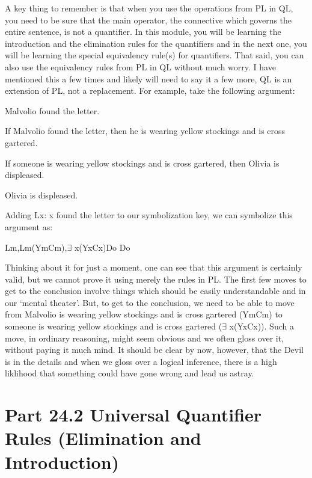 A key thing to remember is that when you use the operations from PL in QL, you need to be sure that the main operator, the connective which governs the entire sentence, is not a quantifier. In this module, you will be learning the introduction and the elimination rules for the quantifiers and in the next one, you will be learning the special equivalency rule(s) for quantifiers. That said, you can also use the equivalency rules from PL in QL without much worry. I have mentioned this a few times and likely will need to say it a few more, QL is an extension of PL, not a replacement. For example, take the following argument:
\begin{earg}
\item[]Malvolio found the letter.
\item[]If Malvolio found the letter, then he is wearing yellow stockings and is cross gartered.
\item[]If someone is wearing yellow stockings and is cross gartered, then Olivia is displeased.
\item[\therefore ] Olivia is displeased.
\end{earg}
Adding Lx: x found the letter to our symbolization key, we can symbolize this argument as:
\begin{center}
Lm,Lm\eif (Ym\eand Cm),$\exists$ x(Yx\eand Cx)\eif Do \therefore Do
\end{center}
Thinking about it for just a moment, one can see that this argument is certainly valid, but we cannot prove it using merely the rules in PL. The first few moves to get to the conclusion involve things which should be easily understandable and in our ‘mental theater'. But, to get to the conclusion, we need to be able to move from Malvolio is wearing yellow stockings and is cross gartered (Ym\eand Cm) to someone is wearing yellow stockings and is cross gartered ($\exists$ x(Yx\eand Cx)). Such a move, in ordinary reasoning, might seem obvious and we often gloss over it, without paying it much mind. It should be clear by now, however, that the Devil is in the details and when we gloss over a logical inference, there is a high liklihood that something could have gone wrong and lead us astray.
\section{Part 24.2 Universal Quantifier Rules (Elimination and Introduction)}
